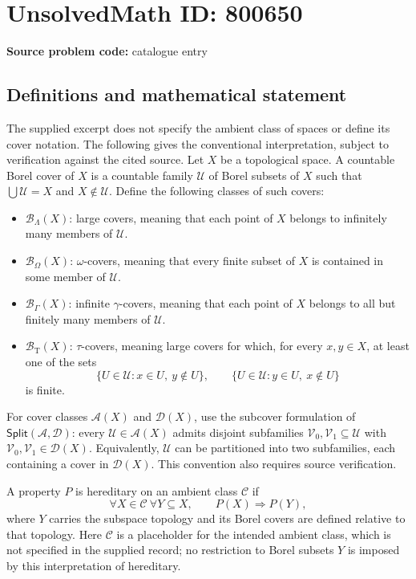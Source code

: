 \documentclass[11pt]{article}
\begin{document}
\section*{UnsolvedMath ID: 800650}
\textbf{Source problem code:} catalogue entry
\subsection{Definitions and mathematical statement}
The supplied excerpt does not specify the ambient class of spaces or define its cover notation. The following gives the conventional interpretation, subject to verification against the cited source. Let \(X\) be a topological space. A countable Borel cover of \(X\) is a countable family \(\mathcal U\) of Borel subsets of \(X\) such that \(\bigcup\mathcal U=X\) and \(X\notin\mathcal U\). Define the following classes of such covers:
\begin{itemize}
\item \(\mathcal B_\Lambda(X)\): large covers, meaning that each point of \(X\) belongs to infinitely many members of \(\mathcal U\).
\item \(\mathcal B_\Omega(X)\): \(\omega\)-covers, meaning that every finite subset of \(X\) is contained in some member of \(\mathcal U\).
\item \(\mathcal B_\Gamma(X)\): infinite \(\gamma\)-covers, meaning that each point of \(X\) belongs to all but finitely many members of \(\mathcal U\).
\item \(\mathcal B_{\mathrm T}(X)\): \(\tau\)-covers, meaning large covers for which, for every \(x,y\in X\), at least one of the sets
\[
\{U\in\mathcal U:x\in U,\ y\notin U\},\qquad
\{U\in\mathcal U:y\in U,\ x\notin U\}
\]
is finite.
\end{itemize}
For cover classes \(\mathcal A(X)\) and \(\mathcal D(X)\), use the subcover formulation of \(\mathsf{Split}(\mathcal A,\mathcal D)\): every \(\mathcal U\in\mathcal A(X)\) admits disjoint subfamilies \(\mathcal V_0,\mathcal V_1\subseteq\mathcal U\) with \(\mathcal V_0,\mathcal V_1\in\mathcal D(X)\). Equivalently, \(\mathcal U\) can be partitioned into two subfamilies, each containing a cover in \(\mathcal D(X)\). This convention also requires source verification.

A property \(P\) is hereditary on an ambient class \(\mathscr C\) if
\[
\forall X\in\mathscr C\ \forall Y\subseteq X,
\qquad P(X)\Longrightarrow P(Y),
\]
where \(Y\) carries the subspace topology and its Borel covers are defined relative to that topology. Here \(\mathscr C\) is a placeholder for the intended ambient class, which is not specified in the supplied record; no restriction to Borel subsets \(Y\) is imposed by this interpretation of hereditary.
\end{document}
